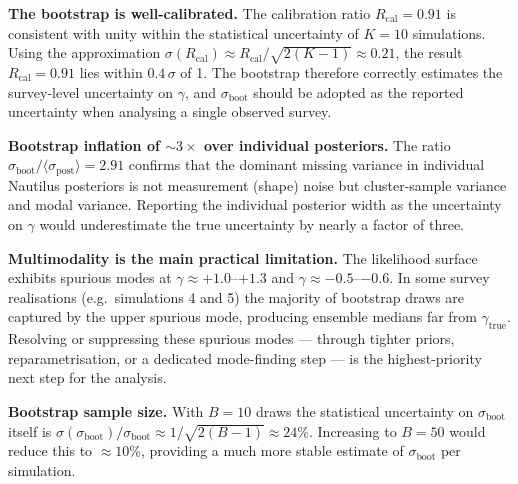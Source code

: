 \documentclass[11pt,a4paper]{article}
\begin{document}
\textbf{The bootstrap is well-calibrated.}
The calibration ratio $R_\mathrm{cal} = 0.91$ is consistent with unity within
the statistical uncertainty of $K = 10$ simulations.  Using the approximation
$\sigma(R_\mathrm{cal}) \approx R_\mathrm{cal}/\sqrt{2(K-1)} \approx 0.21$, the
result $R_\mathrm{cal} = 0.91$ lies within $0.4\,\sigma$ of 1.  The bootstrap
therefore correctly estimates the survey-level uncertainty on $\gamma$, and
$\sigma_\mathrm{boot}$ should be adopted as the reported uncertainty when
analysing a single observed survey.

\textbf{Bootstrap inflation of $\sim 3\times$ over individual posteriors.}
The ratio $\sigma_\mathrm{boot}/\langle\sigma_\mathrm{post}\rangle = 2.91$
confirms that the dominant missing variance in individual Nautilus posteriors is
not measurement (shape) noise but cluster-sample variance and modal variance.
Reporting the individual posterior width as the uncertainty on $\gamma$ would
underestimate the true uncertainty by nearly a factor of three.

\textbf{Multimodality is the main practical limitation.}
The likelihood surface exhibits spurious modes at $\gamma \approx +1.0$--$+1.3$
and $\gamma \approx -0.5$--$-0.6$.  In some survey realisations
(e.g.\ simulations 4 and 5) the majority of bootstrap draws are captured by the
upper spurious mode, producing ensemble medians far from $\gamma_\mathrm{true}$.
Resolving or suppressing these spurious modes --- through tighter priors,
reparametrisation, or a dedicated mode-finding step --- is the highest-priority
next step for the analysis.

\textbf{Bootstrap sample size.}
With $B = 10$ draws the statistical uncertainty on $\sigma_\mathrm{boot}$ itself
is $\sigma(\sigma_\mathrm{boot})/\sigma_\mathrm{boot} \approx 1/\sqrt{2(B-1)} \approx 24\%$.
Increasing to $B = 50$ would reduce this to $\approx 10\%$, providing a much
more stable estimate of $\sigma_\mathrm{boot}$ per simulation.
\end{document}
